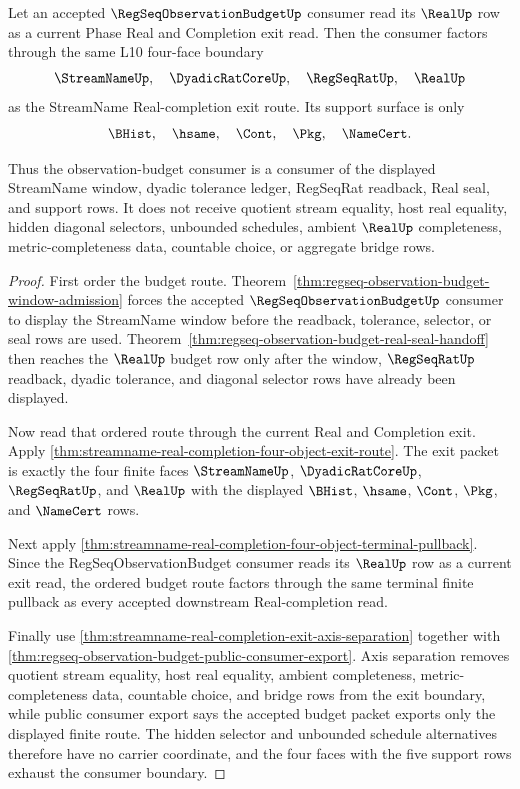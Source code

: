 \begin{theorem}
\label{thm:streamname-regseq-observation-budget-exit-pullback}
Let an accepted $\RegSeqObservationBudgetUp$ consumer read its $\RealUp$ row as a current Phase Real and Completion exit read. Then the consumer factors through the same L10 four-face boundary
$$
\StreamNameUp,\quad \DyadicRatCoreUp,\quad \RegSeqRatUp,\quad \RealUp
$$
as the StreamName Real-completion exit route. Its support surface is only
$$
\BHist,\quad \hsame,\quad \Cont,\quad \Pkg,\quad \NameCert.
$$

Thus the observation-budget consumer is a consumer of the displayed StreamName window, dyadic tolerance ledger, RegSeqRat readback, Real seal, and support rows. It does not receive quotient stream equality, host real equality, hidden diagonal selectors, unbounded schedules, ambient $\RealUp$ completeness, metric-completeness data, countable choice, or aggregate bridge rows.
\end{theorem}
\begin{proof}
First order the budget route. Theorem~\ref{thm:regseq-observation-budget-window-admission} forces the accepted $\RegSeqObservationBudgetUp$ consumer to display the StreamName window before the readback, tolerance, selector, or seal rows are used. Theorem~\ref{thm:regseq-observation-budget-real-seal-handoff} then reaches the $\RealUp$ budget row only after the window, $\RegSeqRatUp$ readback, dyadic tolerance, and diagonal selector rows have already been displayed.

Now read that ordered route through the current Real and Completion exit. Apply \autoref{thm:streamname-real-completion-four-object-exit-route}. The exit packet is exactly the four finite faces $\StreamNameUp$, $\DyadicRatCoreUp$, $\RegSeqRatUp$, and $\RealUp$ with the displayed $\BHist$, $\hsame$, $\Cont$, $\Pkg$, and $\NameCert$ rows.

Next apply \autoref{thm:streamname-real-completion-four-object-terminal-pullback}. Since the RegSeqObservationBudget consumer reads its $\RealUp$ row as a current exit read, the ordered budget route factors through the same terminal finite pullback as every accepted downstream Real-completion read.

Finally use \autoref{thm:streamname-real-completion-exit-axis-separation} together with \autoref{thm:regseq-observation-budget-public-consumer-export}. Axis separation removes quotient stream equality, host real equality, ambient completeness, metric-completeness data, countable choice, and bridge rows from the exit boundary, while public consumer export says the accepted budget packet exports only the displayed finite route. The hidden selector and unbounded schedule alternatives therefore have no carrier coordinate, and the four faces with the five support rows exhaust the consumer boundary.
\end{proof}

